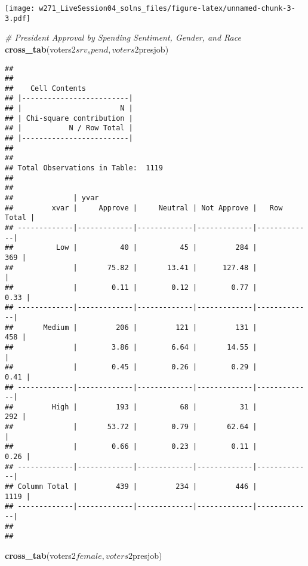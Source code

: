\documentclass[]{article}
\newenvironment{Shaded}{\begin{snugshade}}{\end{snugshade}}
\newcommand{\KeywordTok}[1]{\textcolor[rgb]{0.13,0.29,0.53}{\textbf{{#1}}}}
\newcommand{\CommentTok}[1]{\textcolor[rgb]{0.56,0.35,0.01}{\textit{{#1}}}}
\newcommand{\NormalTok}[1]{{#1}}
\begin{document}
\texttt{[image: w271\_LiveSession04\_solns\_files/figure-latex/unnamed-chunk-3-3.pdf]}

\begin{Shaded}
\begin{Highlighting}[]
\CommentTok{# President Approval by Spending Sentiment, Gender, and Race}
\KeywordTok{cross_tab}\NormalTok{(voters2$srv_spend, voters2$presjob)}
\end{Highlighting}
\end{Shaded}

\begin{verbatim}
## 
##  
##    Cell Contents
## |-------------------------|
## |                       N |
## | Chi-square contribution |
## |           N / Row Total |
## |-------------------------|
## 
##  
## Total Observations in Table:  1119 
## 
##  
##              | yvar 
##         xvar |     Approve |     Neutral | Not Approve |   Row Total | 
## -------------|-------------|-------------|-------------|-------------|
##          Low |          40 |          45 |         284 |         369 | 
##              |       75.82 |       13.41 |      127.48 |             | 
##              |        0.11 |        0.12 |        0.77 |        0.33 | 
## -------------|-------------|-------------|-------------|-------------|
##       Medium |         206 |         121 |         131 |         458 | 
##              |        3.86 |        6.64 |       14.55 |             | 
##              |        0.45 |        0.26 |        0.29 |        0.41 | 
## -------------|-------------|-------------|-------------|-------------|
##         High |         193 |          68 |          31 |         292 | 
##              |       53.72 |        0.79 |       62.64 |             | 
##              |        0.66 |        0.23 |        0.11 |        0.26 | 
## -------------|-------------|-------------|-------------|-------------|
## Column Total |         439 |         234 |         446 |        1119 | 
## -------------|-------------|-------------|-------------|-------------|
## 
## 
\end{verbatim}

\begin{Shaded}
\begin{Highlighting}[]
\KeywordTok{cross_tab}\NormalTok{(voters2$female, voters2$presjob)}
\end{Highlighting}
\end{Shaded}
\end{document}
